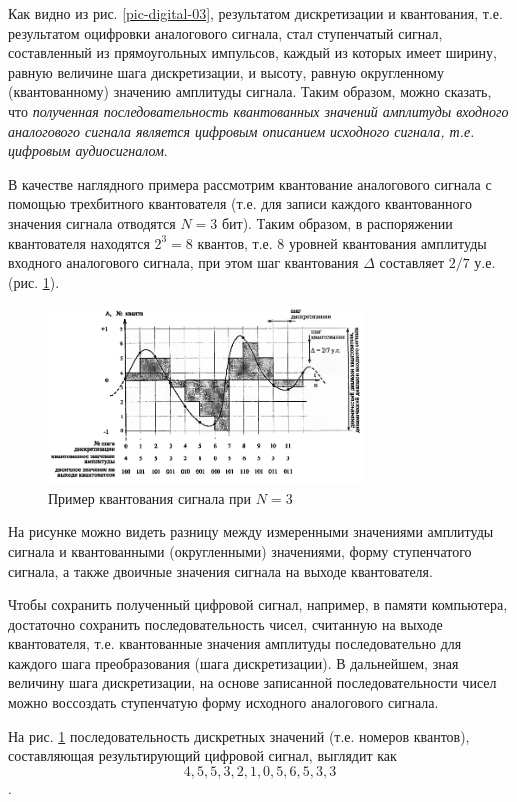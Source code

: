\documentclass[oneside, final, 14pt]{extreport}
\begin{document}
Как видно из рис. \ref{pic-digital-03}, результатом дискретизации и квантования, т.е. результатом оцифровки аналогового сигнала, стал ступенчатый сигнал, составленный из прямоугольных импульсов, каждый из которых имеет ширину, равную величине шага дискретизации, и высоту, равную округленному (квантованному) значению амплитуды сигнала. Таким образом, можно сказать, что \textit{полученная последовательность квантованных значений амплитуды входного аналогового сигнала является цифровым описанием исходного сигнала, т.е. цифровым аудиосигналом}.

В качестве наглядного примера рассмотрим квантование аналогового сигнала с помощью трехбитного квантователя (т.е. для записи каждого квантованного значения сигнала отводятся $N=3$ бит). Таким образом, в распоряжении квантователя находятся $2^3=8$ квантов, т.е. 8 уровней квантования амплитуды входного аналогового сигнала, при этом шаг квантования $\Delta$ составляет $2/7$ у.е. (рис. \ref{pic-digital-04}).

\begin{figure}[h]
\centering
\includegraphics[width=0.75\textwidth]{pic-digital-04}
\caption{Пример квантования сигнала при $N=3$}
\label{pic-digital-04}
\end{figure}

На рисунке можно видеть разницу между измеренными значениями амплитуды сигнала и квантованными (округленными) значениями, форму ступенчатого сигнала, а также двоичные значения сигнала на выходе квантователя. 

Чтобы сохранить полученный цифровой сигнал, например, в памяти компьютера, достаточно сохранить последовательность чисел, считанную на выходе квантователя, т.е. квантованные значения амплитуды последовательно для каждого шага преобразования (шага дискретизации). В дальнейшем, зная величину шага дискретизации, на основе записанной последовательности чисел можно воссоздать ступенчатую форму исходного аналогового сигнала.

На рис. \ref{pic-digital-04} последовательность дискретных значений (т.е. номеров квантов), составляющая результирующий цифровой сигнал, выглядит как
\[4, 5, 5, 3, 2, 1, 0, 5, 6, 5, 3, 3\].
\end{document}

